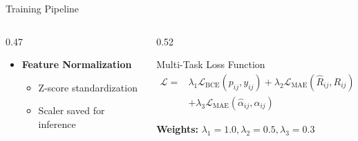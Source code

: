 \documentclass[aspectratio=169]{beamer}
\begin{document}
\begin{frame}{Training Pipeline}
\begin{columns}[T]
\begin{column}{0.47\textwidth}
\begin{itemize}
                \item \textbf{Feature Normalization}
                \begin{itemize}\itemsep0em
                    \item Z-score standardization
                    \item Scaler saved for inference
                \end{itemize}
            \end{itemize}
        \end{column}
        \begin{column}{0.52\textwidth}
            \begin{block}{Multi-Task Loss Function}
                \footnotesize
                \vspace{-0.15cm}
                \begin{align*}
                    \mathcal{L} = &\lambda_1 \mathcal{L}_{\text{BCE}}(p_{ij}, y_{ij}) + \lambda_2 \mathcal{L}_{\text{MAE}}(\hat{R}_{ij}, R_{ij}) \\
                    &+ \lambda_3 \mathcal{L}_{\text{MAE}}(\hat{\alpha}_{ij}, \alpha_{ij})
                \end{align*}
                
                \textbf{Weights:} $\lambda_1=1.0, \lambda_2=0.5, \lambda_3=0.3$
                
            \end{block}
            
            \vspace{0.15cm}
            

\end{column}
\end{columns}
\end{frame}
\end{document}
